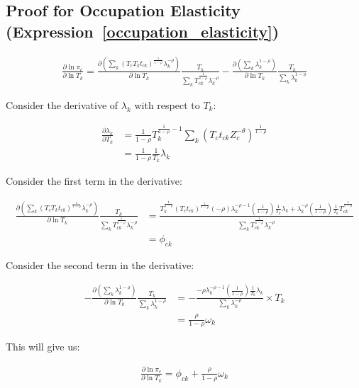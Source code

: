 \documentclass[10pt]{article}
\begin{document}
\subsection{Proof for Occupation Elasticity (Expression~\ref{occupation_elasticity})}

\begin{align*}
    \frac{\partial \ln \pi_c}{\partial \ln T_k} = \frac{\partial \left( \sum_{k}^{} (T_c T_k t_{ck})^{\frac{1}{1 - \rho}} \lambda_k^{- \rho} \right)}{\partial \ln T_k} \frac{T_k}{\sum_{k}^{} T_{ck}^{\frac{1}{1 - \rho}} \lambda_k^{- \rho}} - \frac{\partial \left( \sum_{k}^{} \lambda_k^{1 - \rho} \right)}{\partial \ln T_k} \frac{T_k}{\sum_{k}^{} \lambda_k^{1 - \rho}}
\end{align*}

Consider the derivative of $\lambda_k$ with respect to $T_k$:

\begin{align*}
    \frac{\partial \lambda_k}{\partial T_k} & = \frac{1}{1 - \rho} T_k^{\frac{1}{1 -\rho} - 1} \sum_{k}^{} (T_c t_{ck} Z_c^{- \theta})^{\frac{1}{1 - \rho}} \\
                                            & =\frac{1}{1 - \rho} \frac{1}{T_k} \lambda_k
\end{align*}

Consider the first term in the derivative:

\begin{align*}
    \frac{\partial \left( \sum_{k}^{} (T_c T_k t_{ck})^{\frac{1}{1 - \rho}} \lambda_k^{- \rho} \right)}{\partial \ln T_k} \frac{T_k}{\sum_{k}^{} T_{ck}^{\frac{1}{1 - \rho}} \lambda_k^{- \rho}} & = \frac{T_k^{\frac{1}{1 - \rho}} (T_c t_{ck})^{\frac{1}{1 - \rho}} (- \rho) \lambda_k^{- \rho - 1} \left( \frac{1}{1 - \rho} \right) \frac{1}{T_k} \lambda_k + \lambda_k^{- \rho} \left( \frac{1}{1 - \rho} \right) \frac{1}{T_k} T_{ck}^{\frac{1}{1 - \rho}}}{\sum_{k}^{} T_{ck}^{\frac{1}{1 - \rho}} \lambda_k^{- \rho}} \\
                                                                                                                                                                                                 & = \phi_{ck}
\end{align*}

Consider the second term in the derivative:

\begin{align*}
    - \frac{\partial \left( \sum_{k}^{} \lambda_k^{1 - \rho} \right)}{\partial \ln T_k} \frac{T_k}{\sum_{k}^{} \lambda_k^{1 - \rho}} & = - \frac{- \rho \lambda_k^{- \rho - 1} \left( \frac{1}{1 - \rho} \right) \frac{1}{T_k} \lambda_k}{\sum_{k}^{} \lambda_k^{- \rho}} \times T_k \\
                                                                                                                                     & = \frac{\rho}{1 - \rho} \omega_k
\end{align*}

This will give us:

\begin{align*}
    \frac{\partial \ln \pi_c}{\partial \ln T_k} = \phi_{ck} + \frac{\rho}{1 - \rho} \omega_k
\end{align*}
\end{document}
